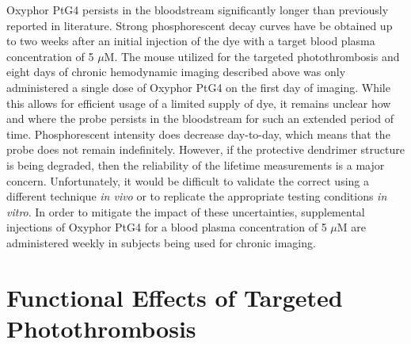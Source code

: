 Oxyphor PtG4 persists in the bloodstream significantly longer than previously reported in literature. Strong phosphorescent decay curves have be obtained up to two weeks after an initial injection of the dye with a target blood plasma concentration of 5 $\mu$M. The mouse utilized for the targeted photothrombosis and eight days of chronic hemodynamic imaging described above was only administered a single dose of Oxyphor PtG4 on the first day of imaging. While this allows for efficient usage of a limited supply of dye, it remains unclear how and where the probe persists in the bloodstream for such an extended period of time. Phosphorescent intensity does decrease day-to-day, which means that the probe does not remain indefinitely. However, if the protective dendrimer structure is being degraded, then the reliability of the lifetime measurements is a major concern. Unfortunately, it would be difficult to validate the correct  using a different technique \textit{in vivo} or to replicate the appropriate testing conditions \textit{in vitro}. In order to mitigate the impact of these uncertainties, supplemental injections of Oxyphor PtG4 for a blood plasma concentration of 5 $\mu$M are administered weekly in subjects being used for chronic imaging.



\section{Functional Effects of Targeted Photothrombosis}

